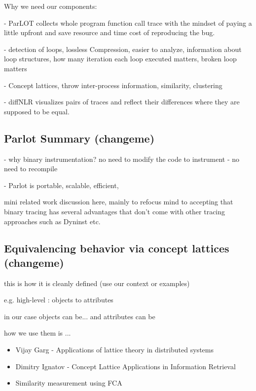 Why we need our components:

- ParLOT collects whole program function call trace with the mindset of paying a little upfront and save resource and time cost of reproducing the bug.

- detection of loops, lossless Compression, easier to analyze, information about loop structures, how many iteration each loop executed matters, broken loop matters

- Concept lattices, throw inter-process information, similarity, clustering

- diffNLR visualizes pairs of traces and reflect their differences where they are supposed to be equal. 



\subsection{Parlot Summary (changeme)}

- why binary instrumentation? no need to modify the code to instrument - no need to recompile

- Parlot is portable, scalable, efficient, 


mini related work discussion here, mainly to refocus mind to accepting that binary tracing has several advantages
that don't come with other tracing approaches such as Dyninst etc.


\subsection{Equivalencing behavior via concept lattices (changeme)}

this is how it is cleanly defined (use our context or examples)

e.g. high-level : objects to attributes

in our case objects can be... and attributes can be

how we use them is ...


\begin{itemize}
\item Vijay Garg - Applications of lattice theory in distributed systems

\item Dimitry Ignatov \cite{ignatov} - Concept Lattice Applications in Information Retrieval

\item \cite{clbook} \cite{clconst} \cite{bender05} \citep{latticeForDistConst} 

Similarity measurement using FCA \cite{Alqadah2011}
\end{itemize}



